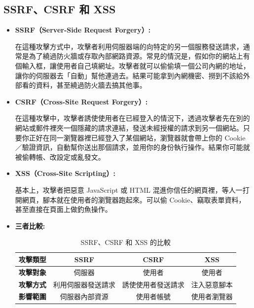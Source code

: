 \documentclass[12pt]{article}
\begin{document}
\clearpage
\subsection{SSRF、CSRF 和 XSS}
\begin{itemize}
  \item \textbf{SSRF（Server-Side Request Forgery）:}

  在這種攻擊方式中，攻擊者利用伺服器端的向特定的另一個服務發送請求，通常是為了繞過防火牆或存取內部網路資源。常見的情況是，假如你的網站上有個輸入框，讓使用者自己填網址。攻擊者就可以偷偷填一個公司內網的地址，讓你的伺服器去「自動」幫他連過去。結果可能拿到內網機密、撈到不該給外部看的資料，甚至繞過防火牆去搞其他事。

  \item \textbf{CSRF（Cross-Site Request Forgery）:}

  在這種攻擊中，攻擊者誘使使用者在已經登入的情況下，透過攻擊者先在別的網站或郵件裡夾一個隱藏的請求連結，發送未經授權的請求到另一個網站。只要你正好在同一瀏覽器裡已經登入了某個網站，瀏覽器就會帶上你的 Cookie／驗證資訊，自動幫你送出那個請求，並用你的身份執行操作。結果你可能就被偷轉帳、改設定或亂發文。

  \item \textbf{XSS（Cross-Site Scripting）:}
  
  基本上，攻擊者把惡意 JavaScript 或 HTML 混進你信任的網頁裡，等人一打開網頁，腳本就在使用者的瀏覽器跑起來。可以偷 Cookie、竊取表單資料，甚至直接在頁面上做釣魚操作。

  \item \textbf{三者比較:} 
  \begin{table}[H]
    \centering
    \begin{tabular}{p{2cm}ccc}
      \toprule
      \textbf{攻擊類型} & \textbf{SSRF} & \textbf{CSRF} & \textbf{XSS} \\
      \midrule
      \textbf{攻擊對象} & 伺服器 & 使用者 & 使用者 \\
      \textbf{攻擊方式} & 利用伺服器發送請求 & 誘使使用者發送請求 & 注入惡意腳本 \\
      \textbf{影響範圍} & 伺服器內部資源 & 使用者帳號 & 使用者瀏覽器 \\
      \bottomrule
    \end{tabular}
    \caption{SSRF、CSRF 和 XSS 的比較}
    \label{tab:ssrf-csrf-xss}
  \end{table}
\end{itemize}


\setcounter{section}{2}
\end{document}
